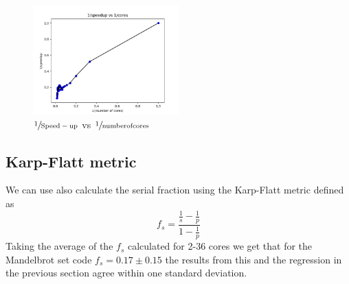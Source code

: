 \documentclass[12pt]{article}
\theoremstyle{plain}
\theoremstyle{definition}
\begin{document}
\begin{figure}
        \includegraphics[width=0.5\textwidth]{inverseq2_strong.png}
        \caption{$\sfrac{1}{\mathrm{Speed-up}}$ vs $\sfrac{1}{\mathrm{number of cores}}$}
        \label{fig:inverse1a}
\end{figure}
\subsection{Karp-Flatt metric}
We can use also calculate the serial fraction using the Karp-Flatt metric defined as 
\begin{equation}
f_s = \frac{\frac{1}{s}-\frac{1}{p}}{1-\frac{1}{p}}
\end{equation}
Taking the average of the $f_s$ calculated for 2-36 cores we get that for the Mandelbrot set code $f_s = 0.17 \pm 0.15 $ the results from this and the regression in the previous section agree within one standard deviation.
\end{document}
